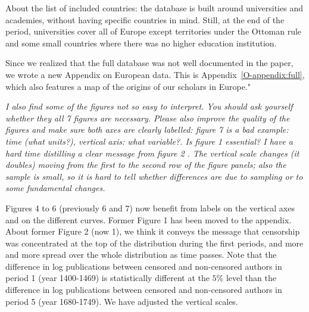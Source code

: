 \documentclass[12pt]{article}
\begin{document}
About the list of included countries: the database is built around universities and academies, without having specific countries in mind. Still, at the end of the period, universities cover all of Europe except territories under the Ottoman rule and some small countries where there was no higher education institution.

Since we realized that the full database was not well documented in the paper, we wrote a new Appendix on European data. This is Appendix~\ref{O-appendix:full}, which also features a map of the origins of our scholars in Europe."

\textit{
I also find some of the figures not so easy to interpret. You should ask yourself
whether they all 7 figures are necessary. Please also improve the quality of the
figures and make sure both axes are clearly labelled: figure 7 is a bad example:
time (what units?), vertical axis: what variable?. Is figure 1 essential? I have a
hard time distilling a clear message from figure 2 . The vertical scale changes (it
doubles) moving from the first to the second row of the figure panels; also the
sample is small, so it is hard to tell whether differences are due to sampling or to
some fundamental changes.}


Figures 4 to 6 (previously 6 and 7) now benefit from labels on the vertical axes and on the different curves. Former Figure 1 has been moved to the appendix. About former Figure 2 (now 1), we think it conveys the message that censorship was concentrated at the top of the distribution during the first periods, and more and more spread over the whole distribution as time passes. Note that the difference in log publications between censored and non-censored authors in period 1 (year 1400-1469) is statistically different at the $5\%$ level than the difference in log publications between censored and non-censored authors in period 5 (year 1680-1749). We have adjusted the vertical scales.



\end{document}
